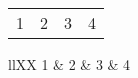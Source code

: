 \documentclass{article}
\begin{document}
	\begin{tabularx}{\linewidth}{llXX}
		1 & 2 & 3 & 4 \\
	\end{tabularx}

	\begin{tabularx}[test]{\linewidth}{llXX}
		1 & 2 & 3 & 4 \\
	\end{tabularx}
\end{document}
